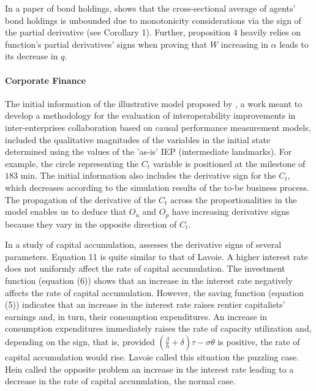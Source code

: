 \documentclass[11pt]{book}
\begin{document}
In a paper of bond holdings, \cite{kocherlakota2021public} shows that the cross-sectional
average of agents' bond holdings is unbounded due to monotonicity
considerations via the sign of the partial derivative (see Corollary 1). Further, proposition
4 heavily relies on function's partial derivatives' signs when proving
that $W$ increasing in $\alpha$ leads to its decrease in $q$.


\paragraph{Corporate Finance}

The initial information of the illustrative model proposed by \cite{camara2014methodology}, a work meant to develop a methodology for the evaluation of interoperability improvements in inter-enterprises collaboration based on causal performance measurement models,
included the qualitative magnitudes of the variables in the initial
state determined using the values of the 'as-is' IEP (intermediate
landmarks). For example, the circle representing the $C_{t}$ variable
is positioned at the milestone of $183$ min. The initial information
also includes the derivative sign for the $C_{t}$, which decreases
according to the simulation results of the to-be business process.
The propagation of the derivative of the $C_{t}$ across the proportionalities
in the model enables us to deduce that $O_{u}$ and $O_{p}$ have
increasing derivative signs because they vary in the opposite direction
of $C_{t}$.

In a study of capital accumulation, \cite{ko2015corporate} assesses the derivative signs of several parameters. Equation
11 is quite similar to that of Lavoie. A higher interest rate does
not uniformly affect the rate of capital accumulation. The investment
function (equation (6)) shows that an increase in the interest rate
negatively affects the rate of capital accumulation. However, the
saving function (equation (5)) indicates that an increase in the interest
rate raises rentier capitalists' earnings and, in turn, their consumption
expenditures. An increase in consumption expenditures immediately
raises the rate of capacity utilization and, depending on the sign,
that is, provided $\left(\frac{\beta}{h}+\delta\right)\tau-\sigma\theta$
is positive, the rate of capital accumulation would rise. Lavoie called
this situation the \textquotedbl puzzling case.\textquotedbl{} Hein
called the opposite problem an increase in the interest rate leading
to a decrease in the rate of capital accumulation, the \textquotedbl normal
case.\textquotedbl{}
\end{document}
